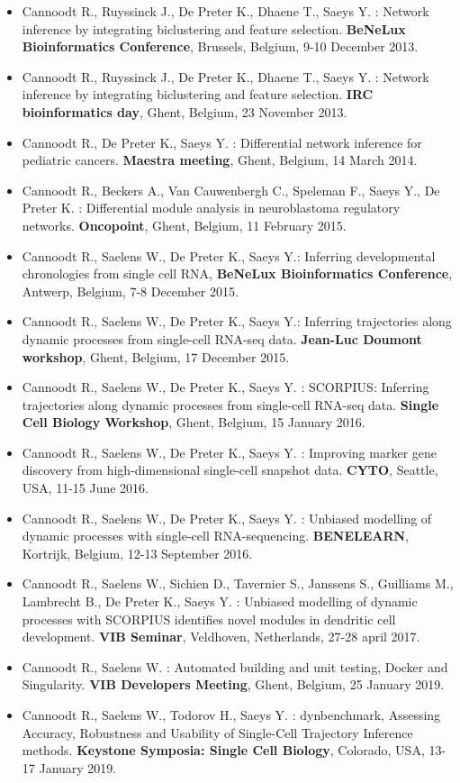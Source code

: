 \begin{itemize}
  \item Cannoodt R., Ruyssinck J., De Preter K., Dhaene T., Saeys Y. : Network inference by integrating biclustering and feature selection. \textbf{BeNeLux Bioinformatics Conference}, Brussels, Belgium, 9-10 December 2013.
  \item Cannoodt R., Ruyssinck J., De Preter K., Dhaene T., Saeys Y. : Network inference by integrating biclustering and feature selection. \textbf{IRC bioinformatics day}, Ghent, Belgium, 23 November 2013.
  \item Cannoodt R., De Preter K., Saeys Y. : Differential network inference for pediatric cancers. \textbf{Maestra meeting}, Ghent, Belgium, 14 March 2014.
  \item Cannoodt R., Beckers A., Van Cauwenbergh C., Speleman F., Saeys Y., De Preter K. : Differential module analysis in neuroblastoma regulatory networks. \textbf{Oncopoint}, Ghent, Belgium, 11 February 2015.
  \item Cannoodt R., Saelens W., De Preter K., Saeys Y.: Inferring developmental chronologies from single cell RNA, \textbf{BeNeLux Bioinformatics Conference}, Antwerp, Belgium, 7-8 December 2015.
  \item Cannoodt R., Saelens W., De Preter K., Saeys Y.: Inferring trajectories along dynamic processes from single-cell RNA-seq data. \textbf{Jean-Luc Doumont workshop}, Ghent, Belgium, 17 December 2015.
  \item Cannoodt R., Saelens W., De Preter K., Saeys Y. : SCORPIUS: Inferring trajectories along dynamic processes from single-cell RNA-seq data. \textbf{Single Cell Biology Workshop}, Ghent, Belgium, 15 January 2016.
  \item Cannoodt R., Saelens W., De Preter K., Saeys Y. : Improving marker gene discovery from high-dimensional single-cell snapshot data. \textbf{CYTO}, Seattle, USA, 11-15 June 2016.
  \item Cannoodt R., Saelens W., De Preter K., Saeys Y. : Unbiased modelling of dynamic processes with single-cell RNA-sequencing. \textbf{BENELEARN}, Kortrijk, Belgium, 12-13 September 2016.
  \item Cannoodt R., Saelens W., Sichien D., Tavernier S., Janssens S., Guilliams M., Lambrecht B., De Preter K., Saeys Y. : Unbiased modelling of dynamic processes with SCORPIUS identifies novel modules in dendritic cell development. \textbf{VIB Seminar}, Veldhoven, Netherlands, 27-28 april 2017.
  \item Cannoodt R., Saelens W. : Automated building and unit testing, Docker and Singularity. \textbf{VIB Developers Meeting}, Ghent, Belgium, 25 January 2019.
  \item Cannoodt R., Saelens W., Todorov H., Saeys Y. : dynbenchmark, Assessing Accuracy, Robustness and Usability of Single-Cell Trajectory Inference methods. \textbf{Keystone Symposia: Single Cell Biology}, Colorado, USA, 13-17 January 2019.
\end{itemize}

